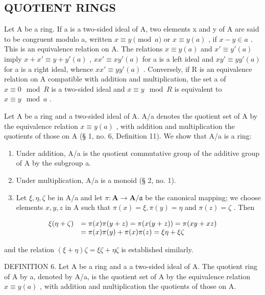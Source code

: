 \subsection{QUOTIENT RINGS}

Let A be a ring. If a is a two-sided ideal of A, two elements x and y of A are said to be congruent modulo a, written \(x \equiv y \pmod{a}\) or \(x \equiv y(a)\) , if \(x - y \in a\) . This is an equivalence relation on A. The relations \(x \equiv y(a)\) and \(x' \equiv y'(a)\) imply \(x + x' \equiv y + y'(a)\) , \(xx' \equiv xy'(a)\) for a is a left ideal and \(xy' \equiv yy'(a)\) for a is a right ideal, whence \(xx' \equiv yy'(a)\) . Conversely, if R is an equivalence relation on A compatible with addition and multiplication, the set a of \(x \equiv 0 \mod R\) is a two-sided ideal and \(x \equiv y \mod R\) is equivalent to \(x \equiv y \mod a\) .

Let A be a ring and a two-sided ideal of A. A/a denotes the quotient set of A by the equivalence relation \(x \equiv y(a)\) , with addition and multiplication the quotients of those on A (§ 1, no. 6, Definition 11). We show that A/a is a ring:

\begin{enumerate}
\def\labelenumi{(\alph{enumi})}
\item
  Under addition, A/a is the quotient commutative group of the additive group of A by the subgroup a.
\item
  Under multiplication, A/a is a monoid (§ 2, no. 1).
\item
  Let \(\xi, \eta, \zeta\) be in A/a and let \(\pi: \mathbf{A} \to \mathbf{A}/\mathfrak{a}\) be the canonical mapping; we choose elements \(x, y, z\) in A such that \(\pi(x) = \xi, \pi(y) = \eta\) and \(\pi(z) = \zeta\) . Then
\end{enumerate}

\[
\begin{array}{r l} \xi (\eta + \zeta) & = \pi (x) \pi (y + z) = \pi (x (y + z)) = \pi (x y + x z) \\ & = \pi (x) \pi (y) + \pi (x) \pi (z) = \xi \eta + \xi \zeta \end{array}
\]

and the relation \((\xi + \eta)\zeta = \xi \zeta + \eta \zeta\) is established similarly.

DEFINITION 6. Let A be a ring and a a two-sided ideal of A. The quotient ring of A by a, denoted by A/a, is the quotient set of A by the equivalence relation \(x \equiv y(a)\) , with addition and multiplication the quotients of those on A.

